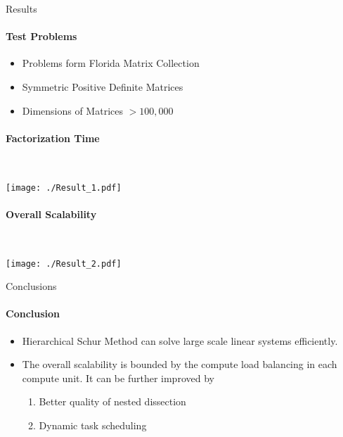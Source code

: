 \documentclass[final]{beamer}
\newlength{\onecolwid}
\begin{document}
\begin{frame}[t]
\begin{columns}[t]
\begin{column}{\onecolwid}
\begin{block}{Results}
          \paragraph{\textbf{Test Problems}}
          \begin{itemize}
            \item Problems form Florida Matrix Collection
            \item Symmetric Positive Definite Matrices
            \item Dimensions of Matrices $>100,000$
          \end{itemize}

          \paragraph{\textbf{Factorization Time}} \\
          \begin{center}
            \texttt{[image: ./Result\_1.pdf]}
          \end{center}

          \paragraph{\textbf{Overall Scalability}} \\
          \begin{center}
            \texttt{[image: ./Result\_2.pdf]}
          \end{center}

        \end{block}
        \begin{block}{Conclusions}
          \paragraph{\textbf{Conclusion}}
          \begin{itemize}
            \item Hierarchical Schur Method can solve large scale linear
                  systems efficiently.
            \item The overall scalability is bounded by the compute load
                  balancing in each compute unit. It can be further
                  improved by 
            \begin{enumerate}
              \item Better quality of nested dissection
              \item Dynamic task scheduling
            \end{enumerate}
          \end{itemize}

\end{block}
\end{column}
\end{columns}
\end{frame}
\end{document}
